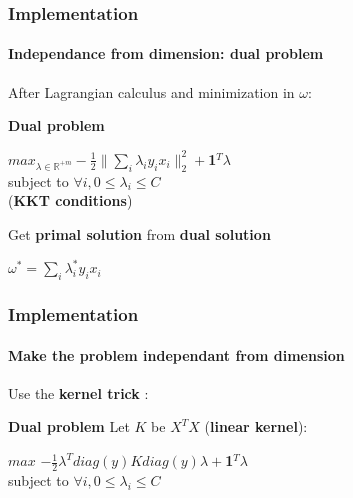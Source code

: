 \documentclass{beamer}
\begin{document}
\begin{frame}
\frametitle{Implementation}
\framesubtitle{Independance from dimension: \textbf{dual problem}}

After Lagrangian calculus and minimization in $\omega$: 

\bigskip
\pause

\begin{block}{\textbf{Dual problem}}
             \begin{center}
             $max_{\lambda \in \mathbb{R}^{+m}} -\frac{1}{2}\|\sum_i\lambda_iy_ix_i\|^2_2 + $\textbf{1}$^T\lambda$\\ 
             subject to $\forall i, 0 \leq \lambda_i \leq C$\\
          
             (\textbf{KKT conditions})
             \end{center}
\end{block}

\pause

\begin{alertblock}{Get \textbf{primal solution} from \textbf{dual solution}}
             \begin{center}
               $\omega^{*} = \sum_i \lambda^{*}_i y_i x_i$
             \end{center}
\end{alertblock}

\end{frame}

\begin{frame}
\frametitle{Implementation}
\framesubtitle{Make the problem independant from dimension}

Use the \textbf{kernel trick} :

\bigskip

\begin{block}{\textbf{Dual problem}}
Let $K$ be $X^TX$ (\textbf{linear kernel}):

\bigskip
                 \begin{center}
                 $max$ $-\frac{1}{2}\lambda^Tdiag(y)Kdiag(y)\lambda+$\textbf{1}$^T\lambda$\\
                 subject to $\forall i, 0 \leq \lambda_i \leq C$ 
                 \end{center}
\end{block}

\end{frame}
\end{document}
